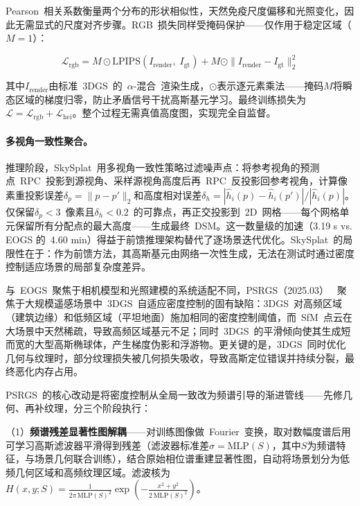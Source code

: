 Pearson~相关系数衡量两个分布的形状相似性，天然免疫尺度偏移和光照变化，因此无需显式的尺度对齐步骤。RGB~损失同样受掩码保护——仅作用于稳定区域（$M=1$）：

\begin{equation}
\mathcal{L}_{\text{rgb}} = M \odot \text{LPIPS}(I_{\text{render}},\;I_{\text{gt}}) + M \odot \|I_{\text{render}} - I_{\text{gt}}\|_2^2
\end{equation}

其中$I_{\text{render}}$由标准~3DGS~的~$\alpha$-混合~渲染生成，$\odot$表示逐元素乘法——掩码$M$将瞬态区域的梯度归零，防止矛盾信号干扰高斯基元学习。最终训练损失为$\mathcal{L} = \mathcal{L}_{\text{rgb}} + \mathcal{L}_{\text{hei}}$。整个过程无需真值高度图，实现完全自监督。

\paragraph{多视角一致性聚合。}推理阶段，SkySplat~用多视角一致性策略过滤噪声点：将参考视角的预测点~RPC~投影到源视角、采样源视角高度后再~RPC~反投影回参考视角，计算像素重投影误差$\delta_p = \|p - p'\|_2$和高度相对误差$\delta_h = |\hat{h}_i(p) - \hat{h}_i(p')|/|\hat{h}_i(p)|$。仅保留$\delta_p < 3$~像素且$\delta_h < 0.2$~的可靠点，再正交投影到~2D~网格——每个网格单元保留所有分配点的最大高度——生成最终~DSM。这一数量级的加速（3.19 s vs. EOGS 的~4.60 min）得益于前馈推理架构替代了逐场景迭代优化。SkySplat~的局限性在于：作为前馈方法，其高斯基元由网络一次性生成，无法在测试时通过密度控制适应场景的局部复杂度差异。

与~EOGS~聚焦于相机模型和光照建模的系统适配不同，PSRGS（2025.03）~\cite{2503_00848} 聚焦于大规模遥感场景中~3DGS~自适应密度控制的固有缺陷：3DGS~对高频区域（建筑边缘）和低频区域（平坦地面）施加相同的密度控制阈值，而~SfM~点云在大场景中天然稀疏，导致高频区域基元不足；同时~3DGS~的平滑倾向使其生成短而宽的大型高斯椭球体，产生梯度伪影和浮游物。更关键的是，3DGS~同时优化几何与纹理时，部分纹理损失被几何损失吸收，导致高斯定位错误并持续分裂，最终恶化内存占用。

PSRGS~的核心改动是将密度控制从全局一致改为频谱引导的渐进管线——先修几何、再补纹理，分三个阶段执行：

（1）\textbf{频谱残差显著性图解耦}——对训练图像做~Fourier~变换，取对数幅度谱后用可学习高斯滤波器平滑得到残差（滤波器标准差$\sigma = \text{MLP}(S)$，其中$S$为频谱特征，与场景几何联合训练），结合原始相位谱重建显著性图，自动将场景划分为低频几何区域和高频纹理区域。滤波核为$H(x,y;S) = \frac{1}{2\pi\,\text{MLP}(S)^2}\exp\!\left(-\frac{x^2+y^2}{2\,\text{MLP}(S)^2}\right)$。

